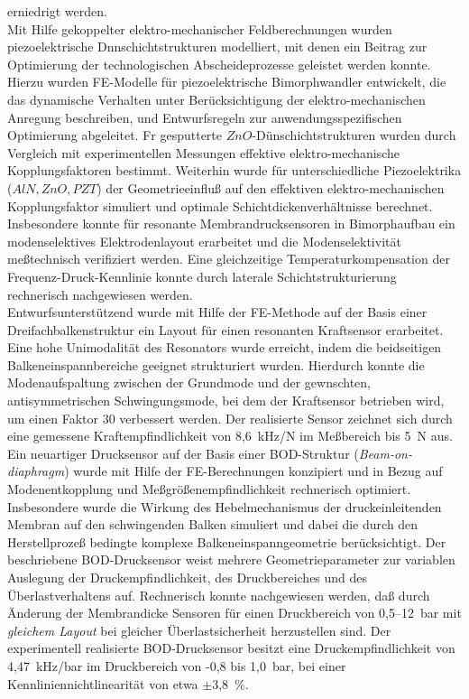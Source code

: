 erniedrigt werden.\\
%
%
Mit Hilfe gekoppelter elektro-mechanischer Feldberechnungen wurden
piezoelektrische Dnnschichtstrukturen modelliert, mit denen ein Beitrag
zur Optimierung der technologischen Abscheideprozesse geleistet werden
konnte. Hierzu wurden FE-Modelle für piezoelektrische Bimorphwandler
entwickelt, die das dynamische Verhalten unter Berücksichtigung der
elektro-mechanischen Anregung beschreiben, und Entwurfsregeln zur
anwendungsspezifischen Optimierung abgeleitet.
Fr gesputterte $ZnO$-Dünschichtstrukturen wurden durch Vergleich mit
experimentellen Messungen effektive elektro-mechanische Kopplungsfaktoren
bestimmt. Weiterhin wurde für unterschiedliche Piezoelektrika
($AlN, ZnO, PZT$) der Geometrieeinfluß auf den effektiven
elektro-mechanischen Kopplungsfaktor simuliert und optimale
Schichtdickenverhältnisse berechnet. Insbesondere konnte für resonante
Membrandrucksensoren in Bimorphaufbau ein modenselektives
Elektrodenlayout erarbeitet und die Modenselektivität meßtechnisch
verifiziert werden.
Eine gleichzeitige Temperaturkompensation der Frequenz-Druck-Kennlinie
konnte durch laterale Schichtstrukturierung rechnerisch nachgewiesen
werden.\\
%
%
Entwurfsunterstützend wurde mit Hilfe der FE-Methode auf der Basis einer
Dreifachbalkenstruktur ein Layout für einen resonanten Kraftsensor
erarbeitet. Eine hohe Uni\-modalität des Resonators wurde erreicht,
indem die beidseitigen Balkeneinspannbereiche geeignet strukturiert wurden.
Hierdurch konnte die Modenaufspaltung zwischen der Grundmode und der
gewnschten, antisymmetrischen Schwingungsmode, bei dem der Kraftsensor
betrieben wird, um einen Faktor 30 verbessert werden.
Der realisierte Sensor zeichnet sich durch eine gemessene
Kraftempfindlichkeit von 8,6~kHz/N im Meßbereich bis 5~N aus.\\
%
Ein neuartiger Drucksensor auf der Basis einer BOD-Struktur
({\em Beam-on-diaphragm}) wurde mit Hilfe der FE-Berechnungen
konzipiert und in Bezug auf Modenentkopplung und
Meßgrößenempfindlichkeit rechnerisch optimiert. Insbesondere wurde
die Wirkung des Hebelmechanismus der druckeinleitenden Membran auf den
schwingenden Balken simuliert und dabei die durch den Herstellprozeß
bedingte komplexe Balkeneinspanngeometrie berücksichtigt.
Der beschriebene BOD-Drucksensor weist mehrere Geometrieparameter zur
variablen Auslegung der Druckempfindlichkeit, des
Druckbereiches und des Überlastverhaltens auf. Rechnerisch konnte
nachgewiesen werden, daß durch Änderung der Membrandicke
Sensoren für einen Druckbereich von 0,5--12~bar mit {\em gleichem Layout}
bei gleicher Überlastsicherheit herzustellen sind.
Der experimentell realisierte BOD-Drucksensor besitzt eine
Druckempfindlichkeit von 4,47~kHz/bar im Druckbereich von -0,8 bis 1,0~bar,
bei einer Kennliniennichtlinearität von etwa $\pm$3,8~\%.


